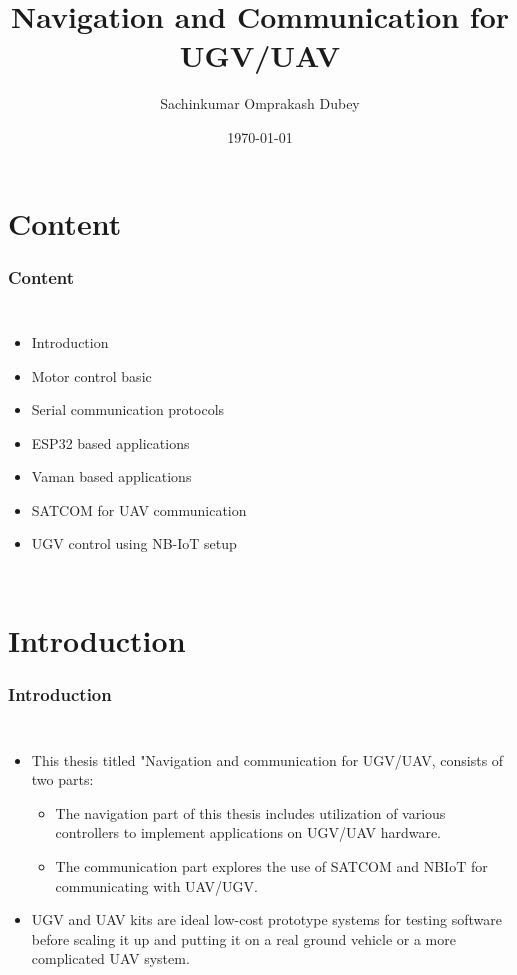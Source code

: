 \documentclass{beamer}
\title{Navigation and Communication for UGV/UAV}
\author{Sachinkumar Omprakash Dubey}
\institute{Indian Institute of Technology, Hyderabad.}
\date{\today}
\begin{document}
\begin{frame}
\titlepage
\end{frame}
\section{Content}
\begin{frame}
\frametitle{Content}
\begin{columns}
  \begin{itemize}
  \item Introduction
  \item Motor control basic
  \item Serial communication protocols
  \item ESP32 based applications
  \item Vaman based applications
  \item SATCOM for UAV communication
  \item UGV control using NB-IoT setup
  \end{itemize}
\end{columns}

\end{frame}


\section{Introduction}
\begin{frame}
\frametitle{Introduction}
\begin{columns}
  \begin{itemize}
  \item This thesis titled "Navigation and communication for UGV/UAV, consists of two parts:
   \begin{itemize}
  \item The navigation part of this thesis includes utilization of various controllers to implement applications on UGV/UAV hardware.
  \item The communication part explores the use of SATCOM and NBIoT for communicating with UAV/UGV.
  \end{itemize}
  \item UGV and UAV kits are ideal low-cost prototype systems for testing software before scaling it up and putting it on a real ground vehicle or a more complicated UAV system. 
  \end{itemize}
\end{columns}
\end{frame}
\end{document}
